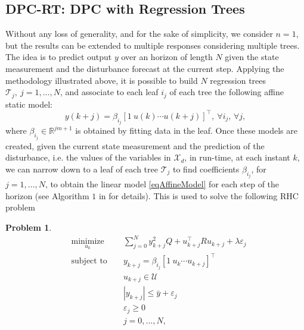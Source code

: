 \documentclass[]{ifacconf}  %
\newtheorem{problem}{Problem}
\begin{document}
\subsection{DPC-RT: DPC with Regression Trees}
Without any loss of generality, and for the sake of simplicity, we consider $n=1$, but the results can be extended to multiple responses considering multiple trees.
The idea is to predict output $y$ over an horizon of length $N$ given the state measurement and the disturbance forecast at the current step. 
Applying the methodology illustrated above, it is possible to build $N$ regression trees $\mathcal{T}_j,\ j=1,\ldots,N$, and associate to each leaf $i_j$ of each tree the following affine static model:
\small
\begin{equation}\label{eqAffineModel}
	y(k+j) = \beta_{i_j}[1\ u(k) \cdots u(k+j)]^\top,\ \forall i_j,\,\forall j,
\end{equation}
\normalsize
where $\beta_{i_j}\in\mathbb{R}^{jm+1}$ is obtained by fitting data in the leaf.
Once these models are created, given the current state measurement and the prediction of the disturbance, i.e. the values of the variables in $\mathcal{X}_d$, in run-time, at each instant $k$, we can narrow down to a leaf of each tree $\mathcal{T}_j$ to find coefficients $\beta_{i_j}$, for $j=1,\ldots,N$, to obtain the linear model \eqref{eqAffineModel} for each step of the horizon (see Algorithm $1$ in \cite{JainCDC2017} for details). This is used to solve the following RHC problem
\begin{problem}\label{pbDPC}
\small
\begin{equation*}
\begin{aligned}
& \underset{u_k}{\text{minimize}} & &  \sum_{j=0}^{N} y_{k+j}^2 Q + u^\top_{k+j} R u_{k+j} +  \lambda\varepsilon_j  \\
& \text{subject to }            & &  y_{k+j}        =   \beta_{i_j} [1\ u_{k} \cdots u_{k+j} ]^\top                   \\
&                               & &  u_{k+j}     \in  \mathcal{U}                                                     \\
&                               & &  |y_{k+j}|     \leq \bar{y} + \varepsilon_j 										\\
&                               & &  \varepsilon_j \geq  0																\\
&                               & &  j              =    0,\ldots,N,            									    \\
\end{aligned}
\end{equation*}
\normalsize
\end{problem}
\end{document}
